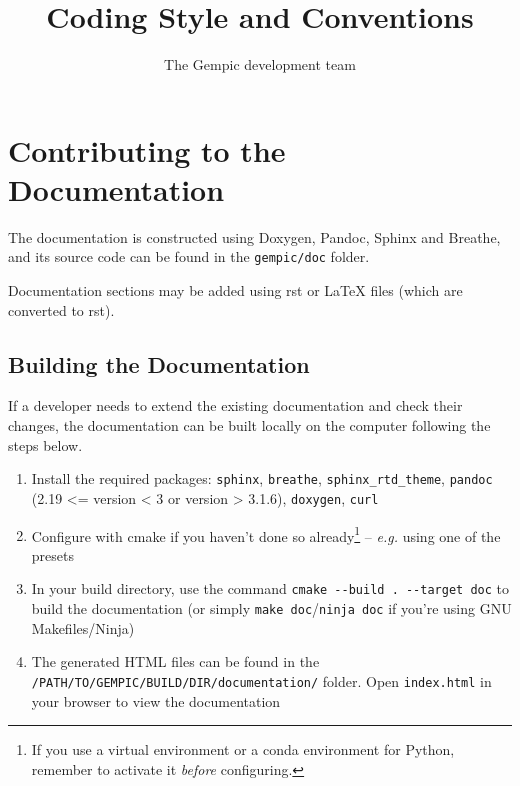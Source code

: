 \documentclass[11pt]{article}
\title{Coding Style and Conventions}
\author[1]{The Gempic development team}
\affil[1]{Max-Planck-Institut f\"ur Plasmaphysik, Garching, Germany}
\begin{document}
\maketitle

\tableofcontents

\section{Contributing to the Documentation}
The documentation is constructed using Doxygen, Pandoc, Sphinx and Breathe, and its source code can be found in the \verb|gempic/doc| folder.

Documentation sections may be added using rst or LaTeX files (which are converted to rst).

\subsection{Building the Documentation}
If a developer needs to extend the existing documentation and check their changes, the documentation can be built locally on the computer following the steps below. 
\begin{enumerate}
   \item Install the required packages: \verb|sphinx|, \verb|breathe|, \verb|sphinx_rtd_theme|, \verb|pandoc| (2.19 <= version < 3 or version > 3.1.6), \verb|doxygen|, \verb|curl|
   \item Configure with cmake if you haven't done so already\footnote{If you use a virtual environment or a conda environment for Python, remember to activate it \emph{before} configuring.} -- \emph{e.g.} using one of the presets
   \item In your build directory, use the command \verb|cmake --build . --target doc| to build the documentation (or simply \verb|make doc|/\verb|ninja doc| if you're using GNU Makefiles/Ninja)
   \item The generated HTML files can be found in the \verb|/PATH/TO/GEMPIC/BUILD/DIR/documentation/| folder. Open \verb|index.html| in your browser to view the documentation
\end{enumerate}
\end{document}

